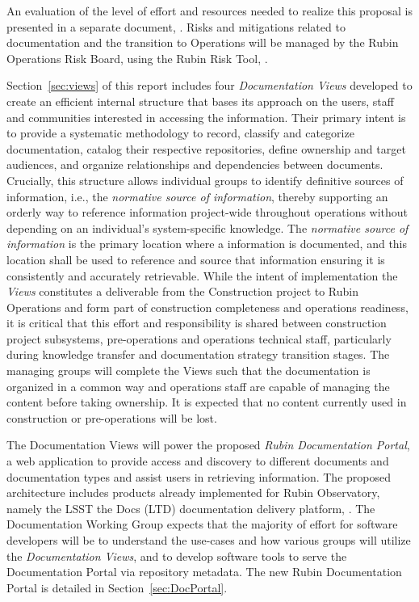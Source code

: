 An evaluation of the level of effort and resources needed to realize this proposal is presented in a separate document, .
Risks and mitigations related to documentation and the transition to Operations will be managed by the Rubin Operations Risk Board, using the Rubin Risk Tool, .

Section~\ref{sec:views} of this report includes four \emph{Documentation Views} developed to create an efficient internal structure that bases its approach on the users, staff and communities interested in accessing the information.
Their primary intent is to provide a systematic methodology to record, classify and categorize documentation, catalog their respective repositories, define ownership and target audiences, and organize relationships and dependencies between documents.
Crucially, this structure allows individual groups to identify definitive sources of information, i.e., the \emph{normative source of information}, thereby supporting an orderly way to reference information project-wide throughout operations without depending on an individual's system-specific knowledge.
The \emph{normative source of information} is the primary location where a information is documented, and this location shall be used to reference and source that information ensuring it is consistently and accurately retrievable.
While the intent of implementation the \emph{Views} constitutes a deliverable from the Construction project to Rubin Operations and form part of construction completeness and operations readiness, it is critical that this effort and responsibility is shared between construction project subsystems, pre-operations and operations technical staff, particularly during knowledge transfer and documentation strategy transition stages.
The managing groups will complete the Views such that the documentation is organized in a common way and operations staff are capable of managing the content before taking ownership.
It is expected that no content currently used in construction or pre-operations will be lost.

The Documentation Views will power the proposed \emph{Rubin Documentation Portal}, a web application to provide access and discovery to different documents and documentation types and assist users in retrieving information.
The proposed architecture includes products already implemented for Rubin Observatory, namely the LSST the Docs (LTD) documentation delivery platform, .
The Documentation Working Group expects that the majority of effort for software developers will be to understand the use-cases and how various groups will utilize the \emph{Documentation Views}, and to develop software tools to serve the Documentation Portal via repository metadata.
The new Rubin Documentation Portal is detailed in Section~\ref{sec:DocPortal}.

